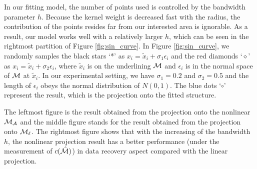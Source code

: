 \documentclass{article}
\theoremstyle{remark}
\begin{document}
In our fitting model, the number of points used is controlled by the bandwidth parameter $h$. Because the kernel weight is decreased fast with the radius, the contribution of the points resides far from our interested area is ignorable. As a result, our model works well with a relatively larger $h$, which can be seen in the rightmost partition of Figure \eqref{fig:sin_curve}. In Figure \eqref{fig:sin_curve}, we randomly samples the black stars `*' as $x_i = \tilde{x}_i+\sigma_1\epsilon_i$ and the red diamonds `$\diamond$' as $x_i = \tilde{x}_i+\sigma_2\epsilon_i$, where $\tilde{x}_i$ is on the underlining $\cal M$ and $\epsilon_i$ is in the normal space of $\cal M$ at $\tilde{x}_i$. In our experimental setting, we have $\sigma_1=0.2$ and $\sigma_2=0.5$ and the length of $\epsilon_i$ obeys the normal distribution of $N(0,1)$. The blue dots `$\circ$' represent the result, which is the projection onto the fitted structure. 

The leftmost figure is the result obtained from the projection onto the nonlinear $\cal M_A$ and the middle figure stands for the result obtained from the projection onto $\cal M_\ell$.
The rightmost figure shows that with the increasing of the bandwidth $h$, the nonlinear projection result has a better performance (under the measurement of $c({\hat{\cal M}})$) in data recovery aspect compared with the linear projection.

\end{document}
